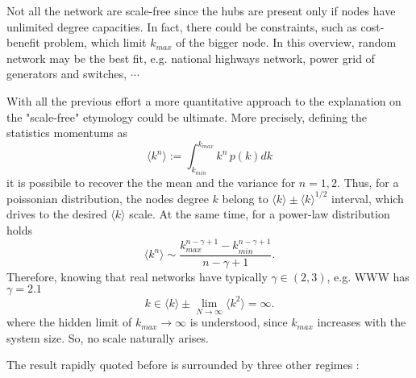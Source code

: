 \documentclass[a4paper,12pt,twoside]{book} %
\theoremstyle{definition}
\begin{document}
Not all the network are scale-free since the hubs are present only if nodes have unlimited degree capacities.
In fact, there could be constraints, such as cost-benefit problem, which limit $k_{max}$ of the bigger node. In this overview, random network may be the best fit, e.g. national highways network, power grid of generators and switches, $\cdots$

With all the previous effort a more quantitative approach to the explanation on the "scale-free" etymology could be ultimate.
More precisely, defining the statistics momentums as
\begin{equation}
	\langle k^n \rangle := \int_{k_{min}}^{k_{max}} k^n\, p(k) dk
\end{equation}
it is possibile to recover the the mean and the variance for $n = 1,2$.
Thus, for a poissonian distribution, the nodes degree $k$ belong to $\langle k \rangle \pm  \langle k \rangle ^ {1/2}$ interval, which drives to the desired $\langle k \rangle$ scale. At the same time, for a power-law distribution holds	
\begin{equation}
	\langle k^n \rangle \sim \frac{k_{max}^{n-\gamma+1}-k_{min}^{n-\gamma+1}}{n-\gamma+1}
	.
\end{equation}
Therefore, knowing that real networks have typically $\gamma \in (2,3)$, e.g. WWW has $\gamma =  2.1$ \cite{barabasi::2016networkbook}
\begin{equation}
	k \in \langle k \rangle \pm \lim_{N \to \infty} \langle k^2 \rangle = \infty.
\end{equation}
where the hidden limit of \( k_{max} \to \infty \) is understood, since $k_{max}$ increases with the system size. 
So, no scale naturally arises.

The result rapidly quoted before is surrounded by three other regimes 
\cite{Cohen:2003_SFUSW}:
\end{document}
